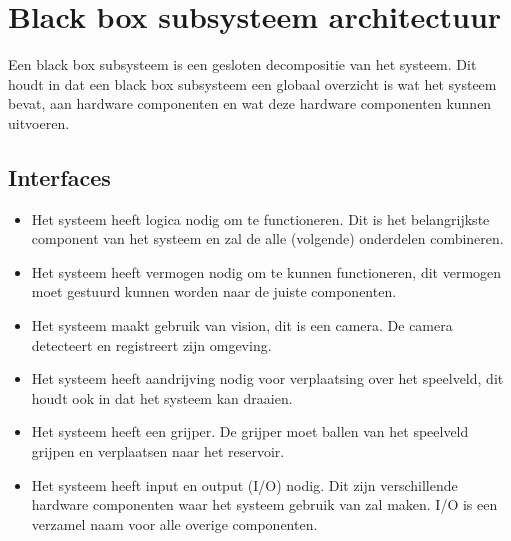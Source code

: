 \documentclass[12pt]{article} %
\begin{document}
\newpage
\section{Black box subsysteem architectuur}
\label{sec:Black box subsysteem architectuur}
Een black box subsysteem is een gesloten decompositie van het systeem. Dit houdt in dat een black box subsysteem een globaal overzicht is wat het systeem bevat, aan hardware componenten en wat deze hardware componenten kunnen uitvoeren.

\subsection{Interfaces}
\begin{itemize}
\item Het systeem heeft logica nodig om te functioneren. Dit is het belangrijkste component van het systeem en zal de alle (volgende) onderdelen combineren.
\item Het systeem heeft vermogen nodig om te kunnen functioneren, dit vermogen moet gestuurd kunnen worden naar de juiste componenten.
\item Het systeem maakt gebruik van vision, dit is een camera. De camera detecteert en registreert zijn omgeving.
\item Het systeem heeft aandrijving nodig voor verplaatsing over het speelveld, dit houdt ook in dat het systeem kan draaien.
\item Het systeem heeft een grijper. De grijper moet ballen van het speelveld grijpen en verplaatsen naar het reservoir.
\item Het systeem heeft input en output (I/O) nodig. Dit zijn verschillende hardware componenten waar het systeem gebruik van zal maken. I/O is een verzamel naam voor alle overige componenten. 
\end{itemize}
\clearpage
\end{document}
